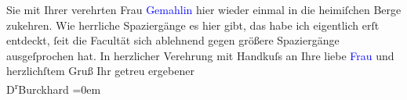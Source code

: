                     Sie mit Ihrer verehrten Frau \textcolor{blue}{Gemahlin}{} hier wieder einmal in die heimiſchen Berge zukehren. Wie
                    herrliche Spaziergänge es hier gibt, das habe ich eigentlich erſt entdeckt, ſeit
                    die Facultät sich ablehnend gegen größere Spaziergänge ausgeſprochen hat.\pend
           \pstart
           {\pb}In herzlicher Verehrung mit Handkuſs
                    an Ihre liebe \textcolor{blue}{Frau}{} und
                    herzlichſtem Gruß\pend
           \pstart
           Ihr getreu ergebener{\\[\baselineskip]}\spacefill\mbox{D\textsuperscript{r}Burckhard}\pend
           \leftskip=0em{}\endnumbering{}  
      